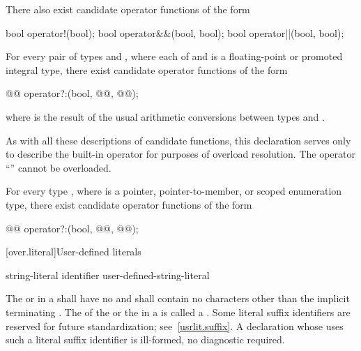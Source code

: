 \pnum
There also exist candidate operator functions of the form
\begin{codeblock}
bool    operator!(bool);
bool    operator&&(bool, bool);
bool    operator||(bool, bool);
\end{codeblock}

\pnum
For every pair of types  and ,
where each of  and  is a
floating-point or promoted integral type,
there exist candidate operator functions of the form
\begin{codeblock}
@@      operator?:(bool, @@, @@);
\end{codeblock}
where
is the result of the usual arithmetic conversions between types
and
.
\begin{note}
As with all these descriptions of candidate functions, this declaration serves
only to describe the built-in operator for purposes of overload resolution.
The operator
``''
cannot be overloaded.
\end{note}

\pnum
For every type
,
where
is a pointer, pointer-to-member, or scoped enumeration type, there exist candidate operator
functions of the form
\begin{codeblock}
@@       operator?:(bool, @@, @@);
\end{codeblock}%

[over.literal]{User-defined literals}%
%

\begin{bnf}
\br
     string-literal identifier\br
     user-defined-string-literal
\end{bnf}

\pnum
The  or 
in a  shall have no
 and shall contain no characters other than the
implicit terminating .
The  of the  or
the  in a  is called a
.
Some literal suffix identifiers are reserved for future standardization;
see~\ref{usrlit.suffix}.  A declaration whose  uses
such a literal suffix identifier is ill-formed, no diagnostic required.

